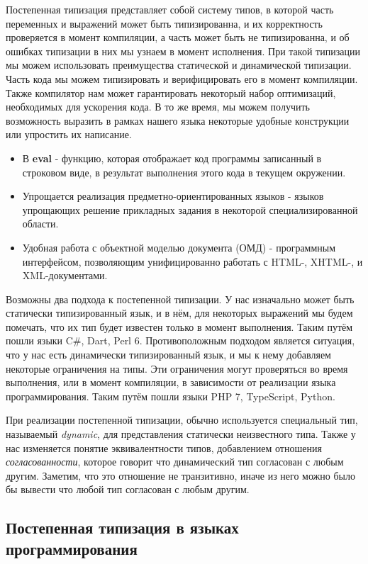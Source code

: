 Постепенная типизация представляет собой систему типов, в которой часть переменных и выражений может быть типизированна, и их корректность проверяется в момент компиляции, а часть может быть не типизированна, и об ошибках типизации в них мы узнаем в момент исполнения. При такой типизации мы можем использовать преимущества статической и динамической типизации. Часть кода мы можем типизировать и верифицировать его в момент компиляции. Также компилятор нам может гарантировать некоторый набор оптимизаций, необходимых для ускорения кода. В то же время, мы можем получить возможность выразить в рамках нашего языка некоторые удобные конструкции или упростить их написание.

\begin{itemize}
    \item В \textbf{eval} - функцию, которая отображает код программы записанный в строковом виде, в результат выполнения этого кода в текущем окружении.
    \item Упрощается реализация предметно-ориентированных языков - языков упрощающих решение прикладных задания в некоторой специализированной области.
    \item Удобная работа с объектной моделью документа (ОМД) - программным интерфейсом, позволяющим унифицированно работать с HTML-, XHTML-, и XML-документами.
\end{itemize}

Возможны два подхода к постепенной типизации. У нас изначально может быть статически типизированный язык, и в нём, для некоторых выражений мы будем помечать, что их тип будет известен только в момент выполнения. Таким путём пошли языки C{\#}, Dart, Perl 6. Противоположным подходом является ситуация, что у нас есть динамически типизированный язык, и мы к нему добавляем некоторые ограничения на типы. Эти ограничения могут проверяться во время выполнения, или в момент компиляции, в зависимости от реализации языка программирования. Таким путём пошли языки PHP 7, TypeScript, Python.

При реализации постепенной типизации, обычно используется специальный тип, называемый \textit{dynamic}, для представления статически неизвестного типа. Также у нас изменяется понятие эквивалентности типов, добавлением отношения \textit{согласованности}, которое говорит что динамический тип согласован с любым другим. Заметим, что это отношение не транзитивно, иначе из него можно было бы вывести что любой тип согласован с любым другим.


\subsection{Постепенная типизация в языках программирования}


